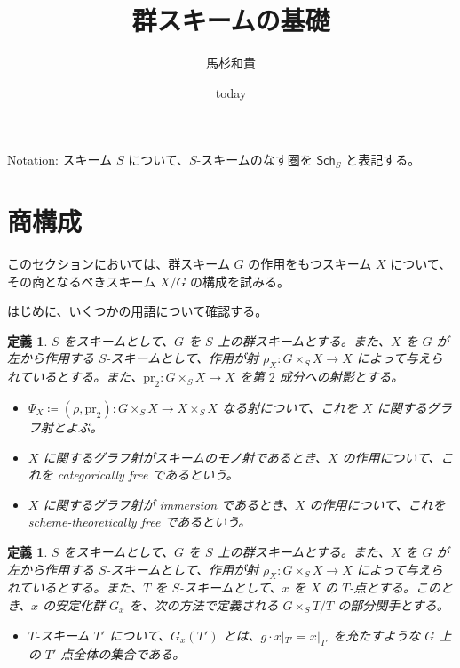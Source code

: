 \documentclass{jsarticle}
\title{群スキームの基礎}
\author{馬杉和貴}
\date{today}
\newcommand{\deq}{\coloneqq}
\newtheorem{defn}[thm]{定義}
\begin{document}
\maketitle




Notation: スキーム $S$ について、$S$-スキームのなす圏を $\mathsf{Sch}_S$ と表記する。

\tableofcontents

\section{商構成}
このセクションにおいては、群スキーム $G$ の作用をもつスキーム $X$ について、その商となるべきスキーム $X / G$ の構成を試みる。

はじめに、いくつかの用語について確認する。

\begin{defn}
	$S$ をスキームとして、$G$ を $S$ 上の群スキームとする。また、$X$ を $G$ が左から作用する $S$-スキームとして、作用が射 $\rho_X \colon G \times_S X \to X$ によって与えられているとする。また、$\mathrm{pr}_2 \colon G \times_S X \to X$ を第 $2$ 成分への射影とする。
	\begin{itemize}
		\item $\Psi_X \deq (\rho, \mathrm{pr}_2) \colon G \times_S X \to X \times_S X$ なる射について、これを $X$ に関するグラフ射とよぶ。
		\item $X$ に関するグラフ射がスキームのモノ射であるとき、$X$ の作用について、これを categorically free であるという。
		\item $X$ に関するグラフ射が immersion であるとき、$X$ の作用について、これを scheme-theoretically free であるという。
	\end{itemize}
\end{defn}

\begin{defn}\label{def_stablizer}
	$S$ をスキームとして、$G$ を $S$ 上の群スキームとする。また、$X$ を $G$ が左から作用する $S$-スキームとして、作用が射 $\rho_X \colon G \times_S X \to X$ によって与えられているとする。また、$T$ を $S$-スキームとして、$x$ を $X$ の $T$-点とする。このとき、$x$ の安定化群 $G_x$ を、次の方法で定義される $G \times_S T / T$ の部分関手とする。
	\begin{itemize}
		\item $T$-スキーム $T'$ について、$G_x(T')$ とは、$g \cdot x|_{T'} = x|_{T'}$ を充たすような $G$ 上の $T'$-点全体の集合である。
	\end{itemize}
\end{defn}
\end{document}
